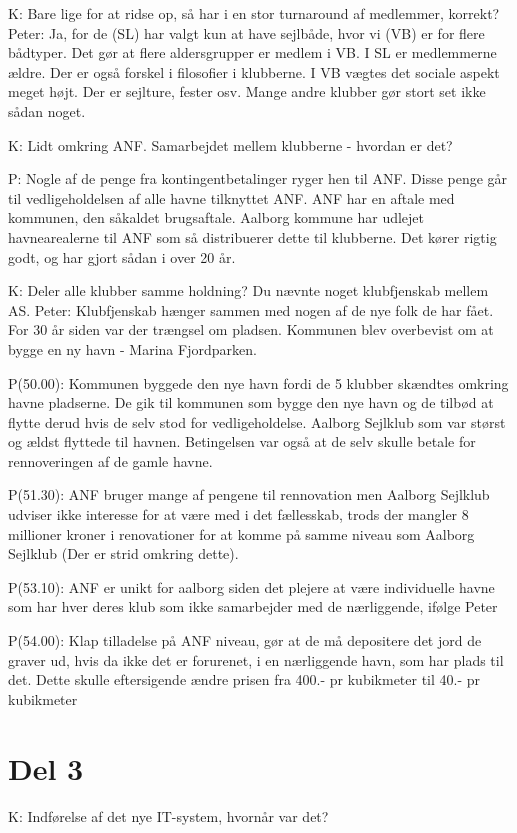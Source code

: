 \documentclass{article}
\begin{document}
K: Bare lige for at ridse op, så har i en stor turnaround af medlemmer, korrekt? Peter: Ja, for de (SL) har valgt kun at have sejlbåde, hvor vi (VB) er for flere bådtyper. Det gør at flere aldersgrupper er medlem i VB. I SL er medlemmerne ældre. Der er også forskel i filosofier i klubberne. I VB vægtes det sociale aspekt meget højt. Der er sejlture, fester osv. Mange andre klubber gør stort set ikke sådan noget.

K: Lidt omkring ANF. Samarbejdet mellem klubberne - hvordan er det?

P: Nogle af de penge fra kontingentbetalinger ryger hen til ANF. Disse penge går til vedligeholdelsen af alle havne tilknyttet ANF. ANF har en aftale med kommunen, den såkaldet brugsaftale. Aalborg kommune har udlejet havnearealerne til ANF som så distribuerer dette til klubberne. Det kører rigtig godt, og har gjort sådan i over 20 år.

K: Deler alle klubber samme holdning? Du nævnte noget klubfjenskab mellem AS. Peter: Klubfjenskab hænger sammen med nogen af de nye folk de har fået. For 30 år siden var der trængsel om pladsen. Kommunen blev overbevist om at bygge en ny havn - Marina Fjordparken.


P(50.00): Kommunen byggede den nye havn fordi de 5 klubber skændtes omkring havne pladserne. De gik til kommunen som bygge den nye havn og de tilbød at flytte derud hvis de selv stod for vedligeholdelse. Aalborg Sejlklub som var størst og ældst flyttede til havnen. Betingelsen var også at de selv skulle betale for rennoveringen af de gamle havne.

P(51.30): ANF bruger mange af pengene til rennovation men Aalborg Sejlklub udviser ikke interesse for at være med i det fællesskab, trods der mangler 8 millioner kroner i renovationer for at komme på samme niveau som Aalborg Sejlklub (Der er strid omkring dette).

P(53.10): ANF er unikt for aalborg siden det plejere at være individuelle havne som har hver deres klub som ikke samarbejder med de nærliggende, ifølge Peter

P(54.00): Klap tilladelse på ANF niveau, gør at de må depositere det jord de graver ud, hvis da ikke det er forurenet, i en nærliggende havn, som har plads til det. Dette skulle eftersigende ændre prisen fra 400.- pr kubikmeter til 40.- pr kubikmeter


\section{Del 3}
K: Indførelse af det nye IT-system, hvornår var det?
\end{document}

